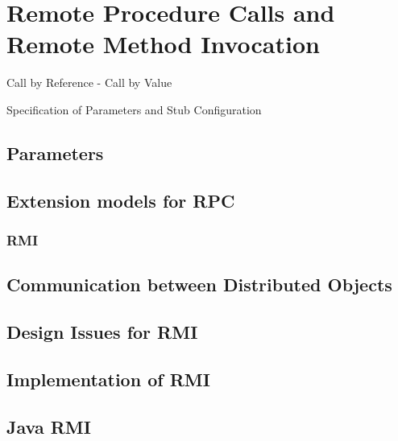 \documentclass[a4paper]{article}
\title{\docTitle}
\author{Moritz}
\date{\today}
\begin{document}
\maketitle
\tableofcontents


\section{Remote Procedure Calls and Remote Method Invocation}

Call by Reference - Call by Value

Specification of Parameters and Stub Configuration

\subsection{Parameters}

\subsection{Extension models for RPC}

\subsubsection{RMI}

\subsection{Communication between Distributed Objects}

\subsection{Design Issues for RMI}

\subsection{Implementation of RMI}

\subsection{Java RMI}
\end{document}
